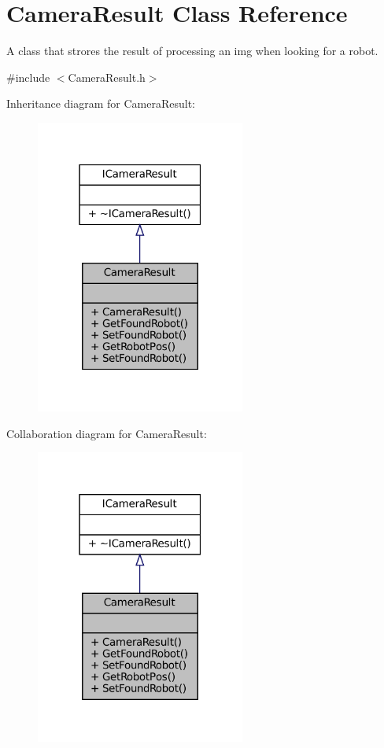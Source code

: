 \hypertarget{classCameraResult}{}\section{Camera\+Result Class Reference}
\label{classCameraResult}


A class that strores the result of processing an img when looking for a robot.  




{\ttfamily \#include $<$Camera\+Result.\+h$>$}



Inheritance diagram for Camera\+Result\+:\nopagebreak
\begin{figure}[H]
\begin{center}
\leavevmode
\includegraphics[width=195pt]{classCameraResult__inherit__graph}
\end{center}
\end{figure}


Collaboration diagram for Camera\+Result\+:\nopagebreak
\begin{figure}[H]
\begin{center}
\leavevmode
\includegraphics[width=195pt]{classCameraResult__coll__graph}
\end{center}
\end{figure}
